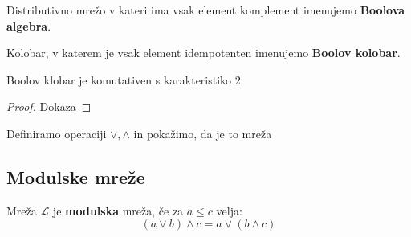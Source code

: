 \documentclass[slovene]{beamer}
\begin{document}
\begin{frame}
\begin{definition}
Distributivno mrežo v kateri ima vsak element komplement imenujemo \textbf{Boolova algebra}.
\end{definition}
\end{frame}

\begin{frame}%
\begin{definition}
Kolobar, v katerem je vsak element idempotenten imenujemo \textbf{Boolov kolobar}.
\end{definition}
\end{frame}


\begin{frame}
\begin{theorem}
Boolov klobar je komutativen s karakteristiko $2$
\end{theorem}

\begin{proof}
Dokaza
\end{proof}
\end{frame}

\begin{frame}
\begin{block}{}
Definiramo operaciji $\lor, \land$ in pokažimo, da je to mreža
\end{block}
\end{frame}




\begin{frame}
\section{Modulske mreže}
\begin{definition}
Mreža $\mathcal{L}$ je \textbf{modulska} mreža, če za $a \leq c$ velja:
$$(a \lor b) \land c = a \lor (b \land c)$$
\end{definition}
\end{frame}
\end{document}
